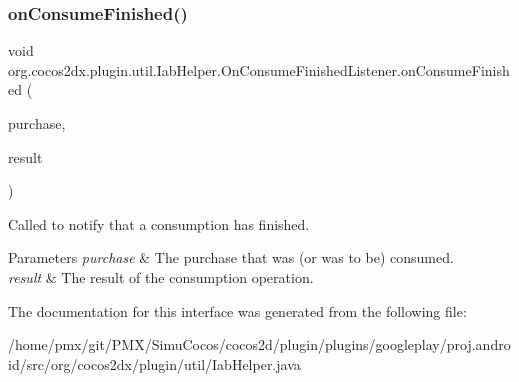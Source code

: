 \subsubsection{\texorpdfstring{on\+Consume\+Finished()}{onConsumeFinished()}}
{\footnotesize\ttfamily void org.\+cocos2dx.\+plugin.\+util.\+Iab\+Helper.\+On\+Consume\+Finished\+Listener.\+on\+Consume\+Finished (\begin{DoxyParamCaption}\item[{\hyperlink{classorg_1_1cocos2dx_1_1plugin_1_1util_1_1Purchase}{Purchase}}]{purchase,  }\item[{\hyperlink{classorg_1_1cocos2dx_1_1plugin_1_1util_1_1IabResult}{Iab\+Result}}]{result }\end{DoxyParamCaption})}

Called to notify that a consumption has finished.


\begin{DoxyParams}{Parameters}
{\em purchase} & The purchase that was (or was to be) consumed. \\
\hline
{\em result} & The result of the consumption operation. \\
\hline
\end{DoxyParams}


The documentation for this interface was generated from the following file\+:\begin{DoxyCompactItemize}
\item 
/home/pmx/git/\+P\+M\+X/\+Simu\+Cocos/cocos2d/plugin/plugins/googleplay/proj.\+android/src/org/cocos2dx/plugin/util/Iab\+Helper.\+java\end{DoxyCompactItemize}

